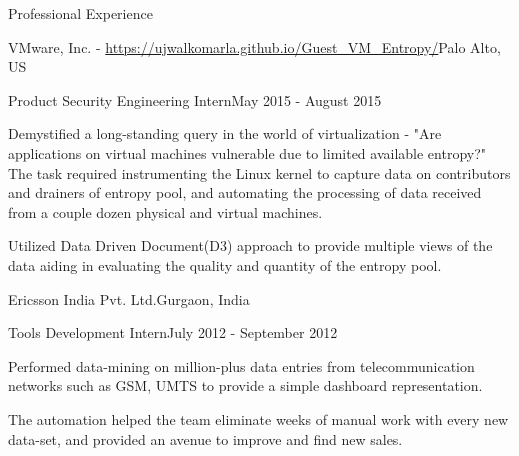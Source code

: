 \documentclass{resume} %
\begin{document}
\begin{rSection}{Professional Experience}
    	\begin{rSubsectionCompany}{VMware, Inc. - \url{https://ujwalkomarla.github.io/Guest_VM_Entropy/}}{Palo Alto, US}
        	\begin{rSubsectionCompanyRole}{Product Security Engineering Intern}{May 2015 - August 2015}
        	    \item Demystified a long-standing query in the world of virtualization - "Are applications on virtual machines vulnerable due to limited available entropy?" \newline
        	    The task required instrumenting the Linux kernel to capture data on contributors and drainers of entropy pool, and automating the processing of data received from a couple dozen physical and virtual machines.
                \item Utilized Data Driven Document(D3) approach to provide multiple views of the data aiding in evaluating the quality and quantity of the entropy pool.
                \begin{comment} %
                    \item Required skills : Linux kernel architecture, Programming - C, Javascript, Shell scripting, Data processing and presentation - Data driven documents, Markup language - HTML, CSS, Probability and stochastic process.
                \end{comment}
            \end{rSubsectionCompanyRole}
    	\end{rSubsectionCompany}
    	
        \begin{rSubsectionCompany}{Ericsson India Pvt. Ltd.}{Gurgaon, India}
            \begin{rSubsectionCompanyRole}{Tools Development Intern}{July 2012 - September 2012}
                    \item Performed data-mining on million-plus data entries from telecommunication networks such as GSM, UMTS to provide a simple dashboard representation.
                    \item The automation helped the team eliminate weeks of manual work with every new data-set, and provided an avenue to improve and find new sales.
            \end{rSubsectionCompanyRole}
       	\end{rSubsectionCompany}
        
    \end{rSection}
\end{document}

